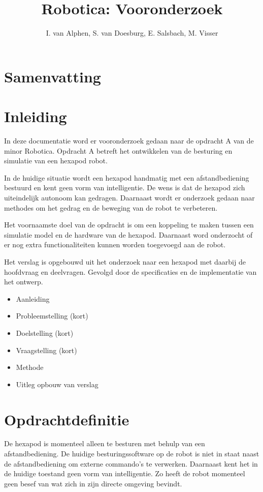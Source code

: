 \documentclass[10pt,a4paper]{article}
\title{Robotica: Vooronderzoek}
\author{I. van Alphen, S. van Doesburg, E.  Salsbach, M. Visser}
\begin{document}
\maketitle
\newpage

\tableofcontents
\newpage

\section{Samenvatting}
\newpage

\section{Inleiding}
In deze documentatie word er vooronderzoek gedaan naar de opdracht A van de minor Robotica. Opdracht A betreft het ontwikkelen van de besturing en simulatie van een hexapod robot.

In de huidige situatie wordt een hexapod handmatig met een afstandbediening bestuurd en kent geen vorm van intelligentie. De wens is dat de hexapod zich uiteindelijk autonoom kan gedragen. Daarnaast wordt er onderzoek gedaan naar methodes om het gedrag en de beweging van de robot te verbeteren.

Het voornaamste doel van de opdracht is om een koppeling te maken tussen een simulatie model en de hardware van de hexapod. Daarnaast word onderzocht of er nog extra functionaliteiten kunnen worden toegevoegd aan de robot.

Het verslag is opgebouwd uit het onderzoek naar een hexapod met daarbij de hoofdvraag en deelvragen. Gevolgd door de specificaties en de implementatie van het ontwerp.


\begin{itemize}
\setlength\itemsep{0em}
\item Aanleiding 
\item Probleemstelling (kort) 
\item Doelstelling (kort) 
\item Vraagstelling (kort) 
\item Methode 
\item Uitleg opbouw van verslag
\end{itemize}

\newpage

\section{Opdrachtdefinitie}
De hexapod is momenteel alleen te besturen met behulp van een afstandbediening. De huidige besturingssoftware op de robot is niet in staat naast de afstandbediening om externe commando's te verwerken. Daarnaast kent het in de huidige toestand geen vorm van intelligentie. Zo heeft de robot momenteel geen besef van wat zich in zijn directe omgeving bevindt.
\end{document}
